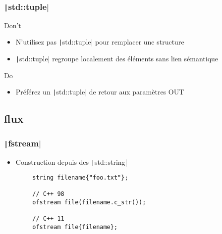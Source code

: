 \documentclass[C++.tex]{subfiles}
\begin{document}
\begin{frame}[fragile]
	\frametitle{\texttt|std::tuple|}
	\begin{alertblock}{Don't}
		\begin{itemize}
			\item N'utilisez pas \texttt|std::tuple| pour remplacer une structure
			\item \texttt|std::tuple| regroupe localement des éléments sans lien sémantique
		\end{itemize}
	\end{alertblock}

	\begin{exampleblock}{Do}
		\begin{itemize}
			\item Préférez un \texttt|std::tuple| de retour aux paramètres OUT
		\end{itemize}
	\end{exampleblock}
\end{frame}

\subsection*{flux}
\begin{frame}[fragile]
	\frametitle{\texttt|fstream|}
	\begin{itemize}
		\item Construction depuis des \texttt|std::string|
	\end{itemize}

	\begin{verbatim}
		string filename{"foo.txt"};

		// C++ 98
		ofstream file(filename.c_str());

		// C++ 11
		ofstream file{filename};
	\end{verbatim}
\end{frame}
\end{document}
